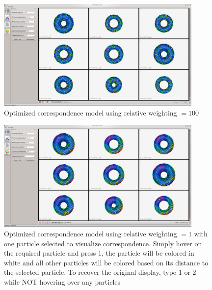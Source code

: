 \documentclass[letterpaper,12pt]{article}   %
\begin{document}
\begin{figure}[!htp]
\centering
\includegraphics[width=0.9\textwidth]{figs/relative_100.png}
\caption{Optimized correspondence model using relative weighting $ = 100$}
\label{fig:rel100}
\end{figure}

\begin{figure}[!htp]
\centering
\includegraphics[width=0.9\textwidth]{figs/rel1_hover1.png}
\caption{Optimized correspondence model using relative weighting $ = 1$ with one particle selected to visualize correspondence. Simply hover on the required particle and press 1, the particle will be colored in white and all other particles will be colored based on its distance to the selected particle. To recover the original display, type 1 or 2 while NOT hovering over any particles}
\label{fig:rel1_hover1}
\end{figure}
\end{document}
